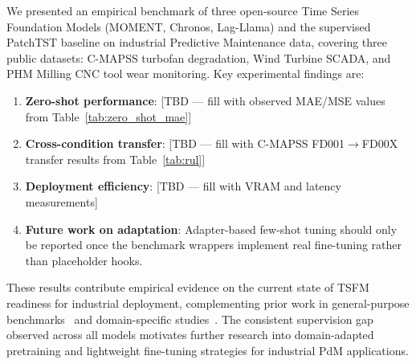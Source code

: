 
We presented an empirical benchmark of three open-source Time Series Foundation Models (MOMENT, Chronos, Lag-Llama) and the supervised PatchTST baseline on industrial Predictive Maintenance data, covering three public datasets: C-MAPSS turbofan degradation, Wind Turbine SCADA, and PHM Milling CNC tool wear monitoring. Key experimental findings are:

\begin{enumerate}
    \item \textbf{Zero-shot performance}: [TBD --- fill with observed MAE/MSE values from Table~\ref{tab:zero_shot_mae}]
    \item \textbf{Cross-condition transfer}: [TBD --- fill with C-MAPSS FD001$\to$FD00X transfer results from Table~\ref{tab:rul}]
    \item \textbf{Deployment efficiency}: [TBD --- fill with VRAM and latency measurements]
    \item \textbf{Future work on adaptation}: Adapter-based few-shot tuning should only be reported once the benchmark wrappers implement real fine-tuning rather than placeholder hooks.
\end{enumerate}

These results contribute empirical evidence on the current state of TSFM readiness for industrial deployment, complementing prior work in general-purpose benchmarks~\cite{foundts2024} and domain-specific studies~\cite{dinten2025}. The consistent supervision gap observed across all models motivates further research into domain-adapted pretraining and lightweight fine-tuning strategies for industrial PdM applications.
